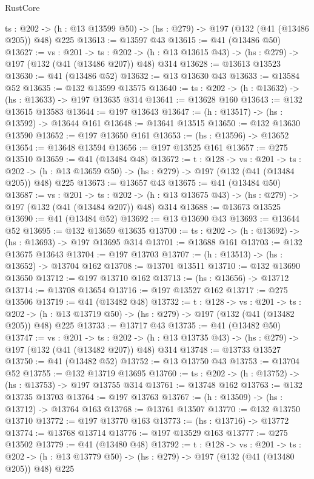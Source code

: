 \begin{lexlean}{RustCore}
\begin{coremodule}
  {ts : @202} -> (h : @13 @13599 @50) -> (hs : @279) -> @197 (@132 (@41 (@13486 @205)) @48) @225
@13613 := @13597 @43
@13615 := @41 (@13486 @50)
@13627 := {vs : @201} ->
  {ts : @202} -> (h : @13 @13615 @43) -> (hs : @279) -> @197 (@132 (@41 (@13486 @207)) @48) @314
@13628 := @13613 @13523
@13630 := @41 (@13486 @52)
@13632 := @13 @13630 @43
@13633 := @13584 @52
@13635 := @132 @13599 @13575
@13640 := {ts : @202} -> (h : @13632) -> (hs : @13633) -> @197 @13635 @314
@13641 := @13628 @160
@13643 := @132 @13615 @13583
@13644 := @197 @13643
@13647 := (h : @13517) -> (hs : @13592) -> @13644 @161
@13648 := @13641 @13515
@13650 := @132 @13630 @13590
@13652 := @197 @13650 @161
@13653 := (hs : @13596) -> @13652
@13654 := @13648 @13594
@13656 := @197 @13525 @161
@13657 := @275 @13510
@13659 := @41 (@13484 @48)
@13672 := {t : @128} ->
  {vs : @201} ->
  {ts : @202} -> (h : @13 @13659 @50) -> (hs : @279) -> @197 (@132 (@41 (@13484 @205)) @48) @225
@13673 := @13657 @43
@13675 := @41 (@13484 @50)
@13687 := {vs : @201} ->
  {ts : @202} -> (h : @13 @13675 @43) -> (hs : @279) -> @197 (@132 (@41 (@13484 @207)) @48) @314
@13688 := @13673 @13525
@13690 := @41 (@13484 @52)
@13692 := @13 @13690 @43
@13693 := @13644 @52
@13695 := @132 @13659 @13635
@13700 := {ts : @202} -> (h : @13692) -> (hs : @13693) -> @197 @13695 @314
@13701 := @13688 @161
@13703 := @132 @13675 @13643
@13704 := @197 @13703
@13707 := (h : @13513) -> (hs : @13652) -> @13704 @162
@13708 := @13701 @13511
@13710 := @132 @13690 @13650
@13712 := @197 @13710 @162
@13713 := (hs : @13656) -> @13712
@13714 := @13708 @13654
@13716 := @197 @13527 @162
@13717 := @275 @13506
@13719 := @41 (@13482 @48)
@13732 := {t : @128} ->
  {vs : @201} ->
  {ts : @202} -> (h : @13 @13719 @50) -> (hs : @279) -> @197 (@132 (@41 (@13482 @205)) @48) @225
@13733 := @13717 @43
@13735 := @41 (@13482 @50)
@13747 := {vs : @201} ->
  {ts : @202} -> (h : @13 @13735 @43) -> (hs : @279) -> @197 (@132 (@41 (@13482 @207)) @48) @314
@13748 := @13733 @13527
@13750 := @41 (@13482 @52)
@13752 := @13 @13750 @43
@13753 := @13704 @52
@13755 := @132 @13719 @13695
@13760 := {ts : @202} -> (h : @13752) -> (hs : @13753) -> @197 @13755 @314
@13761 := @13748 @162
@13763 := @132 @13735 @13703
@13764 := @197 @13763
@13767 := (h : @13509) -> (hs : @13712) -> @13764 @163
@13768 := @13761 @13507
@13770 := @132 @13750 @13710
@13772 := @197 @13770 @163
@13773 := (hs : @13716) -> @13772
@13774 := @13768 @13714
@13776 := @197 @13529 @163
@13777 := @275 @13502
@13779 := @41 (@13480 @48)
@13792 := {t : @128} ->
  {vs : @201} ->
  {ts : @202} -> (h : @13 @13779 @50) -> (hs : @279) -> @197 (@132 (@41 (@13480 @205)) @48) @225

\end{coremodule}
\end{lexlean}

